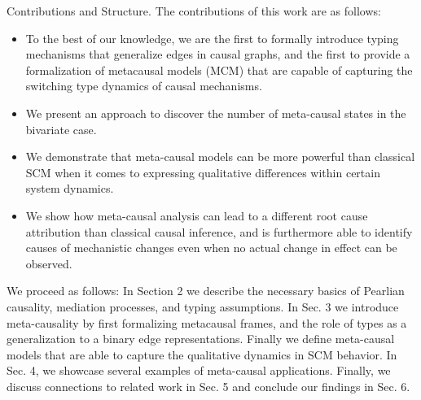 \documentclass[10pt]{article}
\begin{document}
Contributions and Structure. The contributions of this work are as follows:

\begin{itemize}
  \item To the best of our knowledge, we are the first to formally introduce typing mechanisms that generalize edges in causal graphs, and the first to provide a formalization of metacausal models (MCM) that are capable of capturing the switching type dynamics of causal mechanisms.
  \item We present an approach to discover the number of meta-causal states in the bivariate case.
  \item We demonstrate that meta-causal models can be more powerful than classical SCM when it comes to expressing qualitative differences within certain system dynamics.
  \item We show how meta-causal analysis can lead to a different root cause attribution than classical causal inference, and is furthermore able to identify causes of mechanistic changes even when no actual change in effect can be observed.
\end{itemize}

We proceed as follows: In Section 2 we describe the necessary basics of Pearlian causality, mediation processes, and typing assumptions. In Sec. 3 we introduce meta-causality by first formalizing metacausal frames, and the role of types as a generalization to a binary edge representations. Finally we define meta-causal models that are able to capture the qualitative dynamics in SCM behavior. In Sec. 4, we showcase several examples of meta-causal applications. Finally, we discuss connections to related work in Sec. 5 and conclude our findings in Sec. 6.
\end{document}
